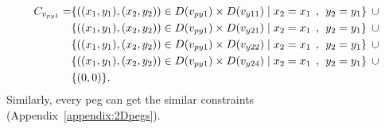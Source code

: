 \begin{equation}
\begin{aligned}  
C_{v_{py1}} = &\{((x_{1},y_{1}),(x_{2},y_{2}))\in D(v_{py1}) \times D(v_{y11})\mid x_{2} = x_{1} \hspace{1ex} , \hspace{1ex}  y_{2} = y_{1}\}\hspace{1ex} \cup  
\\&\{((x_{1},y_{1}),(x_{2},y_{2}))\in D(v_{py1}) \times D(v_{y21})\mid x_{2} = x_{1} \hspace{1ex} , \hspace{1ex}  y_{2} = y_{1}\}\hspace{1ex} \cup 
\\&\{ ((x_{1},y_{1}),(x_{2},y_{2}))\in D(v_{py1}) \times D(v_{y22})\mid x_{2} = x_{1} \hspace{1ex} , \hspace{1ex}  y_{2} = y_{1}\}\hspace{1ex}\cup 
\\& \{((x_{1},y_{1}),(x_{2},y_{2}))\in D(v_{py1}) \times D(v_{y24})\mid x_{2} = x_{1} \hspace{1ex} , \hspace{1ex}  y_{2} = y_{1}\} \hspace{1ex}\cup
\\& \{(0,0)\}.
\end{aligned}
\end{equation}
Similarly, every peg can get the similar constraints (Appendix~\ref{appendix:2Dpegs}).

